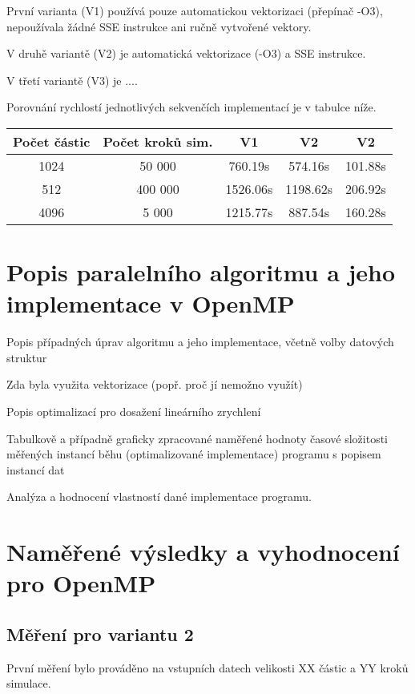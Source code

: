 \documentclass[12pt]{article}
\begin{document}
První varianta (V1) používá pouze automatickou vektorizaci (přepínač -O3), nepoužívala žádné SSE instrukce ani ručně vytvořené vektory.

V druhě variantě (V2) je automatická vektorizace (-O3) a SSE instrukce.

V třetí variantě (V3) je ....

Porovnání rychlostí jednotlivých sekvenčích implementací je v tabulce níže.

\begin{center}
\begin{tabular}{c | c | c | c | c}
\textbf{Počet částic} & \textbf{Počet kroků sim.}  & \textbf{V1} & \textbf{V2} & \textbf{V2} \\ \hline \hline
1024 & 50 000 & 760.19s & 574.16s & 101.88s \\ \hline
512 & 400 000 & 1526.06s & 1198.62s & 206.92s \\ \hline
4096 & 5 000 & 1215.77s & 887.54s & 160.28s \\ \hline
\end{tabular}
\end{center}

\section{Popis paralelního algoritmu a jeho implementace v OpenMP}

    Popis případných úprav algoritmu a jeho implementace, včetně volby datových struktur

    Zda byla využita vektorizace (popř. proč jí nemožno využít)

    Popis optimalizací pro dosažení lineárního zrychlení

    Tabulkově a případně graficky zpracované naměřené hodnoty časové složitosti měřených instancí běhu (optimalizované implementace) programu s popisem instancí dat

    Analýza a hodnocení vlastností dané implementace programu.

\section{Naměřené výsledky a vyhodnocení pro OpenMP}

\subsection{Měření pro variantu 2}
První měření bylo prováděno na vstupních datech velikosti XX částic a YY kroků simulace.
\end{document}

